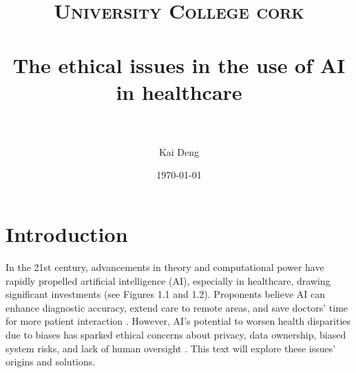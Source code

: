 \documentclass[paper=a4, fontsize=11pt]{scrartcl} %
\title{	
\normalfont \normalsize 
\textsc{University College cork} \\ [25pt] %
\horrule{0.5pt} \\[0.4cm] %
\huge The ethical issues in the use of AI in healthcare \\ %
\horrule{2pt} \\[0.5cm] %
}
\author{Kai Deng} %
\date{\normalsize\today} %
\numberwithin{equation}{section} %
\numberwithin{figure}{section} %
\numberwithin{table}{section} %
\begin{document}
\maketitle %


\section{Introduction}

In the 21st century, advancements in theory and computational power have rapidly propelled 
artificial intelligence (AI), especially in healthcare, drawing significant investments (see Figures 1.1 and 1.2). 
Proponents believe AI can enhance diagnostic accuracy, extend care to remote areas, and save doctors' 
time for more patient interaction \cite{frostPublicViewsEthical2022}. However, AI's potential to worsen 
health disparities due to biases has sparked ethical concerns about privacy, data ownership, biased system risks, 
and lack of human oversight \cite{onianiAdoptingExpandingEthical2023, katiraiEthicsAdvancingArtificial2023}. 
This text will explore these issues' origins and solutions.
\end{document}
